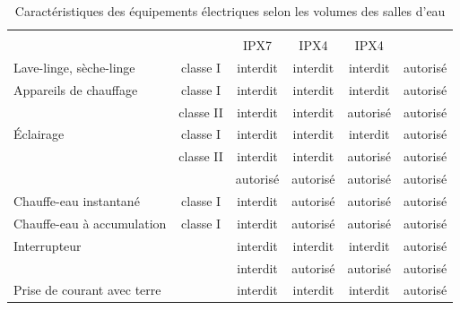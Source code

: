 \begin{table}[t]
\caption{Caractéristiques des équipements électriques selon les volumes des salles d'eau}
\begin{threeparttable} %
\begin{tabularx}{\linewidth}{X ccccc}
\toprule
{} 	& 		& 		& 		& 		&  \\
&&	IPX7		& IPX4			& IPX4			& \\
\midrule
Lave-linge, sèche-linge				& classe I													& interdit						& interdit 						& interdit						& autorisé \\
\addlinespace
Appareils de chauffage 				& classe I												& interdit						& interdit 						& interdit						& autorisé \\
												&classe II												& interdit						& interdit 						& autorisé						& autorisé \\
\addlinespace
\'Eclairage									& classe I													& interdit						& interdit 						& interdit						& autorisé \\
												& classe II													& interdit						& interdit 						& autorisé						& autorisé \\
												& 												& autorisé\tnote{2}						& autorisé\tnote{2} 						& autorisé						& autorisé\tnote{3} \\
\addlinespace
Chauffe-eau instantané				& classe I													& interdit						& autorisé\tnote{4} 					& autorisé\tnote{4}						& autorisé \\
\addlinespace
Chauffe-eau à accumulation				& classe I												& interdit						& autorisé\tnote{5} 					& autorisé\tnote{4}						& autorisé \\
\addlinespace
Interrupteur								& 																& interdit						& interdit 						& interdit						& autorisé \\
												& 	& interdit						& autorisé 						& autorisé						& autorisé \\
\addlinespace
Prise de courant avec terre			& 																& interdit						& interdit 						& interdit						& autorisé \\

\end{tabularx}
\end{threeparttable}
\end{table}
